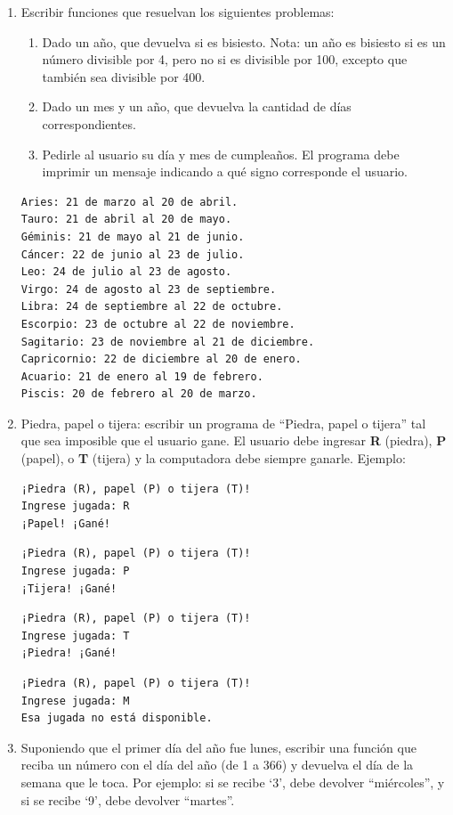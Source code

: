 \documentclass[
  letterpaper,
  DIV=11,
  numbers=noendperiod]{scrreprt}
\providecommand{\tightlist}{%
  \setlength{\itemsep}{0pt}\setlength{\parskip}{0pt}}\usepackage{longtable,booktabs,array}
\begin{document}
\begin{enumerate}
\def\labelenumi{\arabic{enumi}.}
\setcounter{enumi}{4}
\item
  Escribir funciones que resuelvan los siguientes problemas:

  \begin{enumerate}
  \def\labelenumii{\alph{enumii}.}
  \tightlist
  \item
    Dado un año, que devuelva si es bisiesto. Nota: un año es bisiesto
    si es un número divisible por 4, pero no si es divisible por 100,
    excepto que también sea divisible por 400.
  \item
    Dado un mes y un año, que devuelva la cantidad de días
    correspondientes.
  \item
    Pedirle al usuario su día y mes de cumpleaños. El programa debe
    imprimir un mensaje indicando a qué signo corresponde el usuario.
  \end{enumerate}

\begin{verbatim}
Aries: 21 de marzo al 20 de abril.
Tauro: 21 de abril al 20 de mayo.
Géminis: 21 de mayo al 21 de junio.
Cáncer: 22 de junio al 23 de julio.
Leo: 24 de julio al 23 de agosto.
Virgo: 24 de agosto al 23 de septiembre.
Libra: 24 de septiembre al 22 de octubre.
Escorpio: 23 de octubre al 22 de noviembre.
Sagitario: 23 de noviembre al 21 de diciembre.
Capricornio: 22 de diciembre al 20 de enero.
Acuario: 21 de enero al 19 de febrero.
Piscis: 20 de febrero al 20 de marzo.
\end{verbatim}
\item
  Piedra, papel o tijera: escribir un programa de ``Piedra, papel o
  tijera'' tal que sea imposible que el usuario gane. El usuario debe
  ingresar \textbf{R} (piedra), \textbf{P} (papel), o \textbf{T}
  (tijera) y la computadora debe siempre ganarle. Ejemplo:

\begin{verbatim}
¡Piedra (R), papel (P) o tijera (T)!
Ingrese jugada: R
¡Papel! ¡Gané!
\end{verbatim}

\begin{verbatim}
¡Piedra (R), papel (P) o tijera (T)!
Ingrese jugada: P
¡Tijera! ¡Gané!
\end{verbatim}

\begin{verbatim}
¡Piedra (R), papel (P) o tijera (T)!
Ingrese jugada: T
¡Piedra! ¡Gané!
\end{verbatim}

\begin{verbatim}
¡Piedra (R), papel (P) o tijera (T)!
Ingrese jugada: M
Esa jugada no está disponible.
\end{verbatim}
\item
  Suponiendo que el primer día del año fue lunes, escribir una función
  que reciba un número con el día del año (de 1 a 366) y devuelva el día
  de la semana que le toca. Por ejemplo: si se recibe `3', debe devolver
  ``miércoles'', y si se recibe `9', debe devolver ``martes''.
\end{enumerate}
\end{document}
